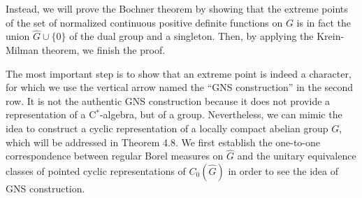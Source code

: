 \documentclass[a4paper]{article}
\begin{document}
Instead, we will prove the Bochner theorem by showing that the extreme points of the set of normalized continuous positive definite functions on $G$ is in fact the union $\hat G\cup\{0\}$ of the dual group and a singleton.
Then, by applying the Krein-Milman theorem, we finish the proof.

The most important step is to show that an extreme point is indeed a character, for which we use the vertical arrow named the ``GNS construction'' in the second row.
It is not the authentic GNS construction because it does not provide a representation of a C$^*$-algebra, but of a group.
Nevertheless, we can mimic the idea to construct a cyclic representation of a locally compact abelian group $G$, which will be addressed in Theorem 4.8.
We first establish the one-to-one correspondence between regular Borel measures on $\hat G$ and the unitary equivalence classes of pointed cyclic representations of $C_0(\hat G)$ in order to see the idea of GNS construction.
\end{document}

